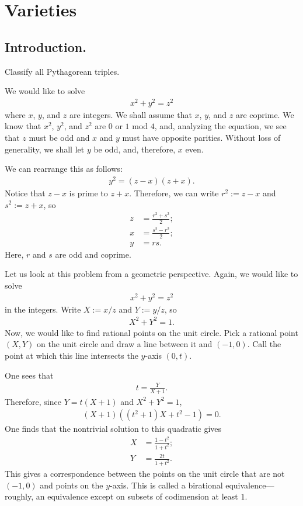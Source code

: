 \documentclass [11 pt, oneside] {article}
\begin{document}
\newpage

\tableofcontents
\ifams
	\vspace*{\fill}
\fi
\hypersetup{linkcolor = Red}
\newpage

\section{Varieties}
\subsection{Introduction.}
\begin{problem}
	Classify all Pythagorean triples.
\end{problem}
We would like to solve
\begin{align*}
	x^2 + y^2 = z^2
\end{align*}
where $x$, $y$, and $z$ are integers. We shall assume that $x$, $y$, and $z$ are coprime. We know that $x^2$, $y^2$, and $z^2$ are $0$ or $1$ mod $4$, and, analyzing the equation, we see that $z$ must be odd and $x$ and $y$ must have opposite parities. Without loss of generality, we shall let $y$ be odd, and, therefore, $x$ even.

We can rearrange this as follows:
\begin{align*}
	y^2 = (z-x) (z+x).
\end{align*}
Notice that $z-x$ is prime to $z+x$. Therefore, we can write $r^2 := z-x$ and $s^2 := z+x$, so
\begin{align*}
	z &= \frac{r^2+s^2}{2};\\
	x &= \frac{s^2-r^2}{2};\\
	y&=rs.
\end{align*}
Here, $r$ and $s$ are odd and coprime.

Let us look at this problem from a geometric perspective. Again, we would like to solve
\begin{align*}
	x^2+y^2=z^2
\end{align*}
in the integers. Write $X:= x/z$ and $Y := y/z$, so
\begin{align*}
	X^2 + Y^2 =1.
\end{align*}
Now, we would like to find rational points on the unit circle. Pick a rational point $(X,Y)$ on the unit circle and draw a line between it and $(-1,0)$. Call the point at which this line intersects the $y$-axis $(0,t)$.

One sees that
\begin{align*}
	t = \frac{Y}{X+1}.
\end{align*}
Therefore, since $Y = t(X+1)$ and $X^2 + Y^2 = 1$,
\begin{align*}
	(X+1) ((t^2+1) X + t^2-1) =0.
\end{align*}
One finds that the nontrivial solution to this quadratic gives
\begin{align*}
	X &= \frac{1-t^2}{1+t^2};\\
	Y &=\frac{2t}{1+t^2}.
\end{align*}
This gives a correspondence between the points on the unit circle that are not $(-1,0)$ and points on the $y$-axis. This is called a birational equivalence---roughly, an equivalence except on subsets of codimension at least $1$. 
\end{document}
